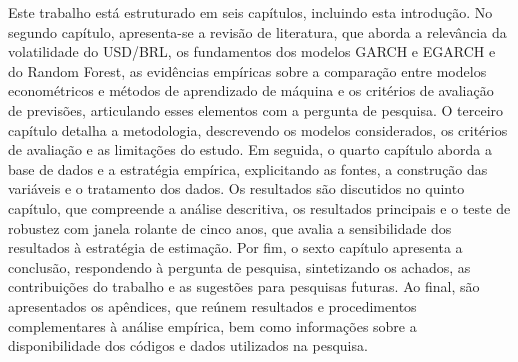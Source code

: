 Este trabalho está estruturado em seis capítulos, incluindo esta introdução.
No segundo capítulo, apresenta-se a revisão de literatura, que aborda a relevância da volatilidade do USD/BRL, os fundamentos dos modelos GARCH e
EGARCH e do Random Forest, as evidências empíricas sobre a comparação entre modelos econométricos e métodos de aprendizado de máquina e os critérios de
avaliação de previsões, articulando esses elementos com a pergunta de pesquisa. O terceiro capítulo detalha a metodologia, descrevendo os modelos considerados,
os critérios de avaliação e as limitações do estudo. Em seguida, o quarto capítulo aborda a base de dados e a estratégia empírica, explicitando as
fontes, a construção das variáveis e o tratamento dos dados. Os resultados são discutidos no quinto capítulo, que compreende a análise descritiva, os
resultados principais e o teste de robustez com janela rolante de cinco anos, que avalia a sensibilidade dos resultados à estratégia de estimação. Por fim,
o sexto capítulo apresenta a conclusão, respondendo à pergunta de pesquisa, sintetizando os achados, as contribuições do trabalho e as sugestões para pesquisas futuras. Ao final, são apresentados os apêndices, que reúnem
resultados e procedimentos complementares à análise empírica, bem como informações sobre a disponibilidade dos códigos e dados utilizados na pesquisa.
